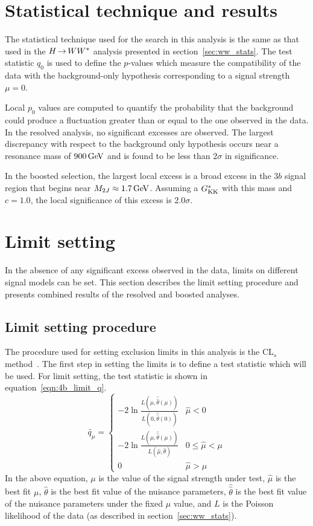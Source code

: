 \section{Statistical technique and results}

The statistical technique used for the search in this analysis is the same as that used in the $H{\,{\rightarrow}\,}WW^\ast$ analysis presented in section~\ref{sec:ww_stats}. The test statistic $q_0$ is used to define the $p$-values which measure the compatibility of the data with the background-only hypothesis corresponding to a signal strength $\mu = 0$. 

Local $p_0$ values are computed to quantify the probability that the background could produce a fluctuation greater than or equal to the one observed in the data. In the resolved analysis, no significant excesses are observed. The largest discrepancy with respect to the background only hypothesis occurs near a resonance mass of $900 \GeV$ and is found to be less than $2\sigma$ in significance.

In the boosted selection, the largest local excess is a broad excess in the $3b$ signal region that begins near $M_{2J} \approx 1.7 \GeV$. Assuming a $G^*_{\rm KK}$ with this mass and $c=1.0$, the local significance of this excess is $2.0 \sigma$. 

\section{Limit setting}

In the absence of any significant excess observed in the data, limits on different signal models can be set. This section describes the limit setting procedure and presents combined results of the resolved and boosted analyses. 

\subsection{Limit setting procedure}

The procedure used for setting exclusion limits in this analysis is the CL$_{s}$ method~\cite{CLS}. The first step in setting the limits is to define a test statistic which will be used. For limit setting, the test statistic is shown in equation~\ref{eqn:4b_limit_q}. 
%
\begin{equation}
\label{eqn:4b_limit_q}
  \widetilde{q_{\mu}} =
  \begin{cases}
    -2\ln \frac{L(\mu,\hat{\hat{\theta}}(\mu))}{L(0,\hat{\hat{\theta}}(0))} & \hat{\mu} < 0 \\
    -2\ln \frac{L(\mu,\hat{\hat{\theta}}(\mu))}{L(\hat{\mu},\hat{\theta})} & 0 \le \hat{\mu} < \mu \\
    0 & \hat{\mu} > \mu
  \end{cases} 
\end{equation}
%
In the above equation, $\mu$ is the value of the signal strength under test, $\hat{\mu}$ is the best fit $\mu$, $\hat{\theta}$ is the best fit value of the nuisance parameters, $\hat{\hat{\theta}}$ is the best fit value of the nuisance parameters under the fixed $\mu$ value, and $L$ is the Poisson likelihood of the data (as described in section~\ref{sec:ww_stats}). 

